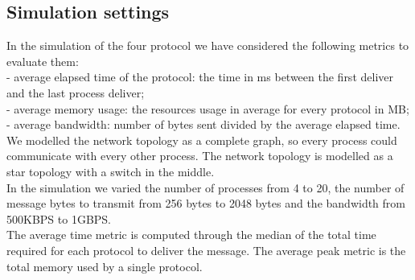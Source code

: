 \documentclass[12pt]{article}
\begin{document}
\subsection{Simulation settings}
In the simulation of the four protocol we have considered the following metrics to evaluate them:\\
- average elapsed time of the protocol: the time in ms between the first deliver and the last process deliver;\\
- average memory usage: the resources usage in average for every protocol in MB;\\
- average bandwidth: number of bytes sent divided by the average elapsed time. \\ 
We modelled the network topology as a complete graph, so every process could communicate with every other process. The network topology is modelled as a star topology with a switch in the middle.\\
In the simulation we varied the number of processes from 4 to 20, the number of message bytes to transmit from 256 bytes to 2048 bytes and the bandwidth from 500KBPS to 1GBPS.\\
The average time metric is computed through the median of the total time required for each protocol to deliver the message. The average peak metric is the total memory used by a single protocol.\\

\newpage
\end{document}
